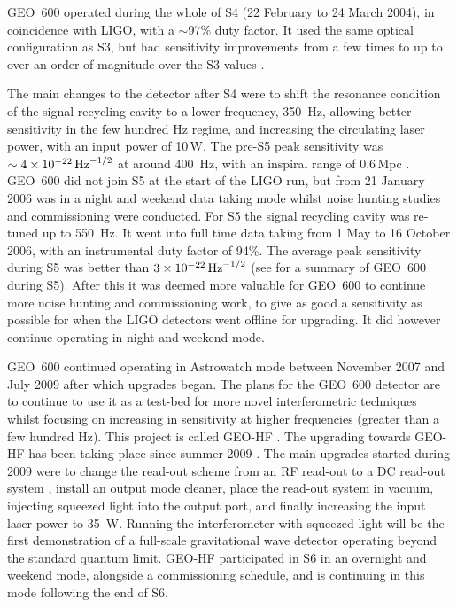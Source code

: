 \documentclass{article}
\begin{document}
GEO~600 operated during the whole of S4 (22 February to 24 March 2004), in
coincidence with LIGO, with a $\sim$97\% duty factor. It used the same optical
configuration as S3, but had sensitivity improvements from a few times to up
to over an order of magnitude over the S3 values \cite{Hild:2006a}.

The main changes to the detector after S4 were to shift the resonance condition
of the signal recycling cavity to a lower frequency, 350~Hz, allowing better
sensitivity in the few hundred Hz regime, and increasing the circulating laser
power, with an input power of 10\,W. The pre-S5 peak sensitivity was
$\sim4\times10^{-22}\,{\rm Hz}^{-1/2}$ at around 400~Hz, with an inspiral
range of 0.6\,Mpc \cite{Hild:2006b}. GEO~600 did not join S5 at the
start of the LIGO run, but from 21 January 2006 was in a night and weekend data
taking mode whilst noise hunting studies and commissioning were conducted. For
S5 the signal recycling cavity was re-tuned up to 550~Hz. It went into full time
data taking from 1 May to 16 October 2006, with an instrumental duty factor of
94\%. The average peak sensitivity during S5 was better than
$3\times10^{-22}\,{\rm Hz}^{-1/2}$ (see \cite{Willke:2007} for a summary of
GEO~600 during S5). After this it was deemed more valuable for GEO~600 to
continue more noise hunting and commissioning work, to give as good a
sensitivity as possible for when the LIGO detectors went offline for upgrading.
It did however continue operating in night and weekend mode. 

GEO~600  continued operating in Astrowatch mode between November 2007 and July 
2009 after which upgrades began. The plans for the GEO~600 detector are to 
continue to use it as a test-bed for more novel interferometric techniques whilst 
focusing on increasing in sensitivity at higher frequencies (greater than a 
few hundred Hz). This project is called
GEO-HF \cite{Willke:2006}. The upgrading towards GEO-HF has been taking
place since summer 2009 \cite{Grote:2010}. The main upgrades started during 2009 
were to change the read-out scheme from an RF read-out to a DC read-out system 
\cite{Hild:2008}, 
install an output mode cleaner, place the read-out system in vacuum, injecting 
squeezed light \cite{Vahlbruch:2008, Chelkowski:2007} into the output port, and 
finally increasing the input laser power to 35~W. Running the interferometer
with squeezed light will be the first demonstration of a full-scale gravitational
wave detector operating beyond the standard quantum limit. GEO-HF participated in 
S6 in an overnight and weekend mode, alongside a commissioning schedule, and is 
continuing in this mode following the end of S6.
\end{document}
